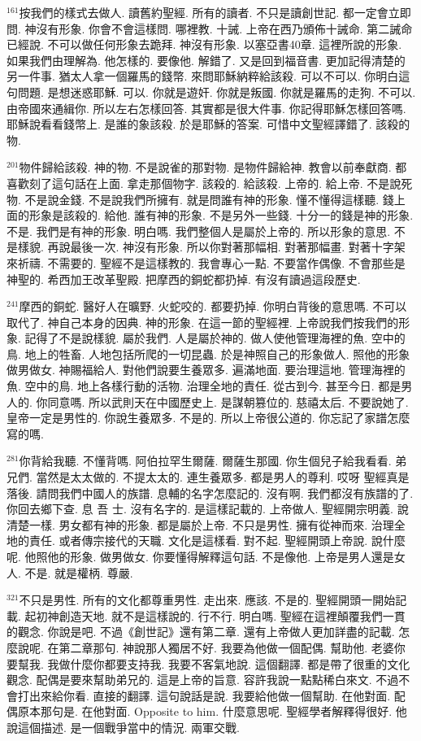\documentclass{book}
\begin{document}
$^{161}$按我們的樣式去做人.
讀舊約聖經.
所有的讀者.
不只是讀創世記.
都一定會立即問.
神沒有形象.
你會不會這樣問.
哪裡教.
十誡.
上帝在西乃頒佈十誡命.
第二誡命已經說.
不可以做任何形象去跪拜.
神沒有形象.
以塞亞書40章.
這裡所說的形象.
如果我們由理解為.
他怎樣的.
要像他.
解錯了.
又是回到福音書.
更加記得清楚的另一件事.
猶太人拿一個羅馬的錢幣.
來問耶穌納粹給該殺.
可以不可以.
你明白這句問題.
是想迷惑耶穌.
可以.
你就是遊奸.
你就是叛國.
你就是羅馬的走狗.
不可以.
由帝國來通緝你.
所以左右怎樣回答.
其實都是很大件事.
你記得耶穌怎樣回答嗎.
耶穌說看看錢幣上.
是誰的象該殺.
於是耶穌的答案.
可惜中文聖經譯錯了.
該殺的物.

$^{201}$物件歸給該殺.
神的物.
不是說雀的那對物.
是物件歸給神.
教會以前奉獻商.
都喜歡刻了這句話在上面.
拿走那個物字.
該殺的.
給該殺.
上帝的.
給上帝.
不是說死物.
不是說金錢.
不是說我們所擁有.
就是問誰有神的形象.
懂不懂得這樣聽.
錢上面的形象是該殺的.
給他.
誰有神的形象.
不是另外一些錢.
十分一的錢是神的形象.
不是.
我們是有神的形象.
明白嗎.
我們整個人是屬於上帝的.
所以形象的意思.
不是樣貌.
再說最後一次.
神沒有形象.
所以你對著那幅相.
對著那幅畫.
對著十字架來祈禱.
不需要的.
聖經不是這樣教的.
我會專心一點.
不要當作偶像.
不會那些是神聖的.
希西加王改革聖殿.
把摩西的銅蛇都扔掉.
有沒有讀過這段歷史.

$^{241}$摩西的銅蛇.
醫好人在曠野.
火蛇咬的.
都要扔掉.
你明白背後的意思嗎.
不可以取代了.
神自己本身的因典.
神的形象.
在這一節的聖經裡.
上帝說我們按我們的形象.
記得了不是說樣貌.
屬於我們.
人是屬於神的.
做人使他管理海裡的魚.
空中的鳥.
地上的牲畜.
人地包括所爬的一切昆蟲.
於是神照自己的形象做人.
照他的形象做男做女.
神賜福給人.
對他們說要生養眾多.
遍滿地面.
要治理這地.
管理海裡的魚.
空中的鳥.
地上各樣行動的活物.
治理全地的責任.
從古到今.
甚至今日.
都是男人的.
你同意嗎.
所以武則天在中國歷史上.
是謀朝篡位的.
慈禧太后.
不要說她了.
皇帝一定是男性的.
你說生養眾多.
不是的.
所以上帝很公道的.
你忘記了家譜怎麼寫的嗎.

$^{281}$你背給我聽.
不懂背嗎.
阿伯拉罕生爾薩.
爾薩生那國.
你生個兒子給我看看.
弟兄們.
當然是太太做的.
不提太太的.
連生養眾多.
都是男人的尊利.
哎呀 聖經真是落後.
請問我們中國人的族譜.
息輔的名字怎麼記的.
沒有啊.
我們都沒有族譜的了.
你回去鄉下查.
息 吾 士.
沒有名字的.
是這樣記載的.
上帝做人.
聖經開宗明義.
說清楚一樣.
男女都有神的形象.
都是屬於上帝.
不只是男性.
擁有從神而來.
治理全地的責任.
或者傳宗接代的天職.
文化是這樣看.
對不起.
聖經開頭上帝說.
說什麼呢.
他照他的形象.
做男做女.
你要懂得解釋這句話.
不是像他.
上帝是男人還是女人.
不是.
就是權柄.
尊嚴.

$^{321}$不只是男性.
所有的文化都尊重男性.
走出來.
應該.
不是的.
聖經開頭一開始記載.
起初神創造天地.
就不是這樣說的.
行不行.
明白嗎.
聖經在這裡顛覆我們一貫的觀念.
你說是吧.
不過《創世記》還有第二章.
還有上帝做人更加詳盡的記載.
怎麼說呢.
在第二章那句.
神說那人獨居不好.
我要為他做一個配偶.
幫助他.
老婆你要幫我.
我做什麼你都要支持我.
我要不客氣地說.
這個翻譯.
都是帶了很重的文化觀念.
配偶是要來幫助弟兄的.
這是上帝的旨意.
容許我說一點點稀白來文.
不過不會打出來給你看.
直接的翻譯.
這句說話是說.
我要給他做一個幫助.
在他對面.
配偶原本那句是.
在他對面.
Opposite to him.
什麼意思呢.
聖經學者解釋得很好.
他說這個描述.
是一個戰爭當中的情況.
兩軍交戰.
\end{document}
